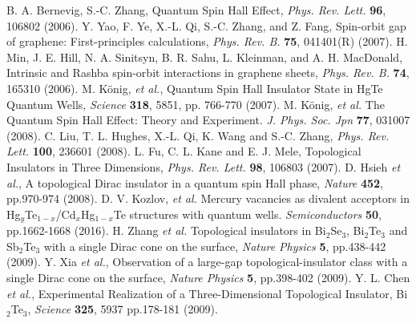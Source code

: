 \documentclass[titlepage,a4paper]{book}
\begin{document}
\begin{thebibliography}{99}
B. A. Bernevig, S.-C. Zhang, Quantum Spin Hall Effect, \textit{Phys. Rev. Lett.} \textbf{96}, 106802 (2006).
Y. Yao, F. Ye, X.-L. Qi, S.-C. Zhang, and Z. Fang, Spin-orbit gap of graphene: First-principles calculations, \textit{Phys. Rev. B.} \textbf{75}, 041401(R) (2007).
H. Min, J. E. Hill, N. A. Sinitsyn, B. R. Sahu, L. Kleinman, and A. H. MacDonald, Intrinsic and Rashba spin-orbit interactions in graphene sheets, \textit{Phys. Rev. B.} \textbf{74}, 165310 (2006).
M. König, \textit{et al.}, Quantum Spin Hall Insulator State in HgTe Quantum Wells, \textit{Science} \textbf{318}, 5851, pp. 766-770 (2007).
M. König, \textit{et al.} The Quantum Spin Hall Effect: Theory and Experiment. \textit{J. Phys. Soc. Jpn} \textbf{77}, 031007 (2008).
C. Liu, T. L. Hughes, X.-L. Qi, K. Wang and S.-C. Zhang, \textit{Phys. Rev. Lett.} \textbf{100}, 236601 (2008).
L. Fu, C. L. Kane and E. J. Mele, Topological Insulators in Three Dimensions, \textit{Phys. Rev. Lett.} \textbf{98}, 106803 (2007).
D. Hsieh \textit{et al.}, A topological Dirac insulator in a quantum spin Hall phase, \textit{Nature} \textbf{452}, pp.970-974 (2008).
D. V. Kozlov, \textit{et al.} Mercury vacancies as divalent acceptors in Hg$_y$Te$_{1-x}$/Cd$_x$Hg$_{1-x}$Te structures with quantum wells. \textit{Semiconductors} \textbf{50}, pp.1662-1668 (2016).
H. Zhang \textit{et al.} Topological insulators in Bi$_2$Se$_3$, Bi$_2$Te$_3$ and Sb$_2$Te$_3$ with a single Dirac cone on the surface, \textit{Nature Physics} \textbf{5}, pp.438-442 (2009).
Y. Xia \textit{et al.}, Observation of a large-gap topological-insulator class with a single Dirac cone on the surface, \textit{Nature Physics} \textbf{5}, pp.398-402 (2009).
Y. L. Chen \textit{et al.}, Experimental Realization of a Three-Dimensional Topological Insulator, Bi$_2$Te$_3$,  \textit{Science} \textbf{325}, 5937 pp.178-181 (2009).



\end{thebibliography}
\end{document}
